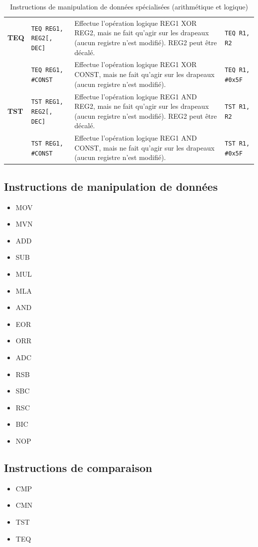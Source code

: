\documentclass{tufte-handout}
\begin{document}
\begin{table}
\begin{tabular}{l|l|p{7.5cm}l}
\hline
\textbf{TEQ} & \texttt{TEQ REG1, REG2[, DEC]} 	& Effectue l'opération logique REG1 XOR REG2, mais ne fait qu'agir sur les drapeaux (aucun registre n'est modifié). REG2 peut être décalé. & \texttt{TEQ R1, R2} \\
 			 & \texttt{TEQ REG1, \#CONST} 			& Effectue l'opération logique REG1 XOR CONST, mais ne fait qu'agir sur les drapeaux (aucun registre n'est modifié). & \texttt{TEQ R1, \#0x5F} \\
\hline
\textbf{TST} & \texttt{TST REG1, REG2[, DEC]} 	& Effectue l'opération logique REG1 AND REG2, mais ne fait qu'agir sur les drapeaux (aucun registre n'est modifié). REG2 peut être décalé. & \texttt{TST R1, R2} \\
 			 & \texttt{TST REG1, \#CONST} 			& Effectue l'opération logique REG1 AND CONST, mais ne fait qu'agir sur les drapeaux (aucun registre n'est modifié). & \texttt{TST R1, \#0x5F} \\

\end{tabular}
\caption{Instructions de manipulation de données spécialisées (arithmétique et logique)}
\end{table}

\subsection{Instructions de manipulation de données}
\begin{itemize}
	\item MOV
	\item MVN
	\item ADD
	\item SUB
	\item MUL
	\item MLA
	\item AND
	\item EOR
	\item ORR
	\item ADC
	\item RSB
	\item SBC
	\item RSC
	\item BIC
	\item NOP
\end{itemize}

\subsection{Instructions de comparaison}
\begin{itemize}
	\item CMP
	\item CMN
	\item TST
	\item TEQ
\end{itemize}
\end{document}

